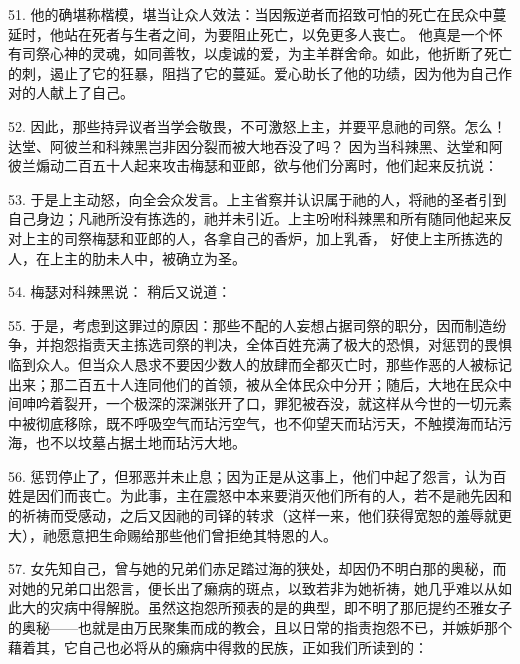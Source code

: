 51. 他的确堪称楷模，堪当让众人效法：当因叛逆者而招致可怕的死亡在民众中蔓延时，他站在死者与生者之间，为要阻止死亡，以免更多人丧亡。 他真是一个怀有司祭心神的灵魂，如同善牧，以虔诚的爱，为主羊群舍命。如此，他折断了死亡的刺，遏止了它的狂暴，阻挡了它的蔓延。爱心助长了他的功绩，因为他为自己作对的人献上了自己。\par

52. 因此，那些持异议者当学会敬畏，不可激怒上主，并要平息祂的司祭。怎么！达堂、阿彼兰和科辣黑岂非因分裂而被大地吞没了吗？ 因为当科辣黑、达堂和阿彼兰煽动二百五十人起来攻击梅瑟和亚郎，欲与他们分离时，他们起来反抗说： \par

53. 于是上主动怒，向全会众发言。上主省察并认识属于祂的人，将祂的圣者引到自己身边；凡祂所没有拣选的，祂并未引近。上主吩咐科辣黑和所有随同他起来反对上主的司祭梅瑟和亚郎的人，各拿自己的香炉，加上乳香， 好使上主所拣选的人，在上主的肋未人中，被确立为圣。\par

54. 梅瑟对科辣黑说：  稍后又说道： \par

55. 于是，考虑到这罪过的原因：那些不配的人妄想占据司祭的职分，因而制造纷争，并抱怨指责天主拣选司祭的判决，全体百姓充满了极大的恐惧，对惩罚的畏惧临到众人。但当众人恳求不要因少数人的放肆而全都灭亡时，那些作恶的人被标记出来；那二百五十人连同他们的首领，被从全体民众中分开；随后，大地在民众中间呻吟着裂开，一个极深的深渊张开了口，罪犯被吞没，就这样从今世的一切元素中被彻底移除，既不呼吸空气而玷污空气，也不仰望天而玷污天，不触摸海而玷污海，也不以坟墓占据土地而玷污大地。\par

56. 惩罚停止了，但邪恶并未止息；因为正是从这事上，他们中起了怨言，认为百姓是因们而丧亡。为此事，主在震怒中本来要消灭他们所有的人，若不是祂先因和的祈祷而受感动，之后又因祂的司铎的转求（这样一来，他们获得宽恕的羞辱就更大），祂愿意把生命赐给那些他们曾拒绝其特恩的人。\par

57. 女先知自己，曾与她的兄弟们赤足踏过海的狭处，却因仍不明白那的奥秘，而对她的兄弟口出怨言，便长出了癞病的斑点，以致若非为她祈祷，她几乎难以从如此大的灾病中得解脱。虽然这抱怨所预表的是的典型，即不明了那厄提约丕雅女子的奥秘——也就是由万民聚集而成的教会，且以日常的指责抱怨不已，并嫉妒那个藉着其，它自己也必将从的癞病中得救的民族，正如我们所读到的：\par

